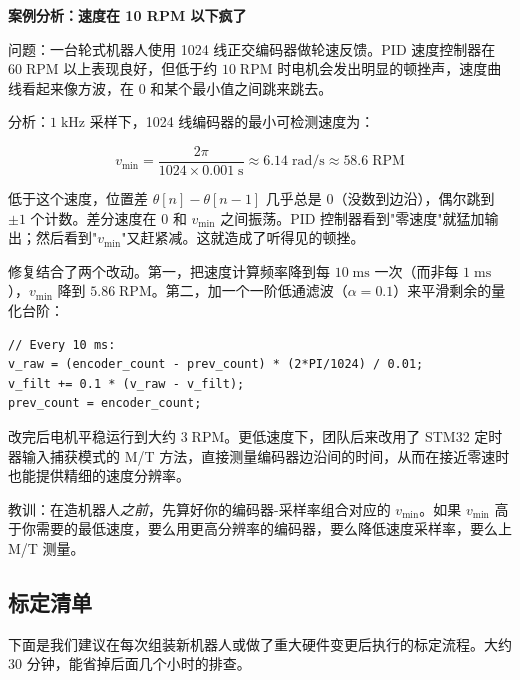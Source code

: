 \vspace{0.5em}
\begin{mdframed}[linewidth=1pt, innertopmargin=10pt, innerbottommargin=10pt]
\textbf{案例分析：速度在 10 RPM 以下疯了}

\vspace{0.3em}
问题：一台轮式机器人使用 1024 线正交编码器做轮速反馈。PID 速度控制器在 $60\;\mathrm{RPM}$ 以上表现良好，但低于约 $10\;\mathrm{RPM}$ 时电机会发出明显的顿挫声，速度曲线看起来像方波，在 $0$ 和某个最小值之间跳来跳去。

分析：$1\;\mathrm{kHz}$ 采样下，1024 线编码器的最小可检测速度为：

\[
v_{\min} = \frac{2\pi}{1024 \times 0.001\;\mathrm{s}} \approx 6.14\;\mathrm{rad/s} \approx 58.6\;\mathrm{RPM}
\]

低于这个速度，位置差 $\theta[n] - \theta[n-1]$ 几乎总是 0（没数到边沿），偶尔跳到 $\pm 1$ 个计数。差分速度在 0 和 $v_{\min}$ 之间振荡。PID 控制器看到"零速度"就猛加输出；然后看到"$v_{\min}$"又赶紧减。这就造成了听得见的顿挫。

修复结合了两个改动。第一，把速度计算频率降到每 $10\;\mathrm{ms}$ 一次（而非每 $1\;\mathrm{ms}$），$v_{\min}$ 降到 $5.86\;\mathrm{RPM}$。第二，加一个一阶低通滤波（$\alpha = 0.1$）来平滑剩余的量化台阶：

\begin{verbatim}
// Every 10 ms:
v_raw = (encoder_count - prev_count) * (2*PI/1024) / 0.01;
v_filt += 0.1 * (v_raw - v_filt);
prev_count = encoder_count;
\end{verbatim}

改完后电机平稳运行到大约 $3\;\mathrm{RPM}$。更低速度下，团队后来改用了 STM32 定时器输入捕获模式的 M/T 方法，直接测量编码器边沿间的时间，从而在接近零速时也能提供精细的速度分辨率。

教训：在造机器人\textit{之前}，先算好你的编码器-采样率组合对应的 $v_{\min}$。如果 $v_{\min}$ 高于你需要的最低速度，要么用更高分辨率的编码器，要么降低速度采样率，要么上 M/T 测量。
\end{mdframed}

\vspace{0.5em}
\subsection{标定清单}

下面是我们建议在每次组装新机器人或做了重大硬件变更后执行的标定流程。大约 30 分钟，能省掉后面几个小时的排查。

